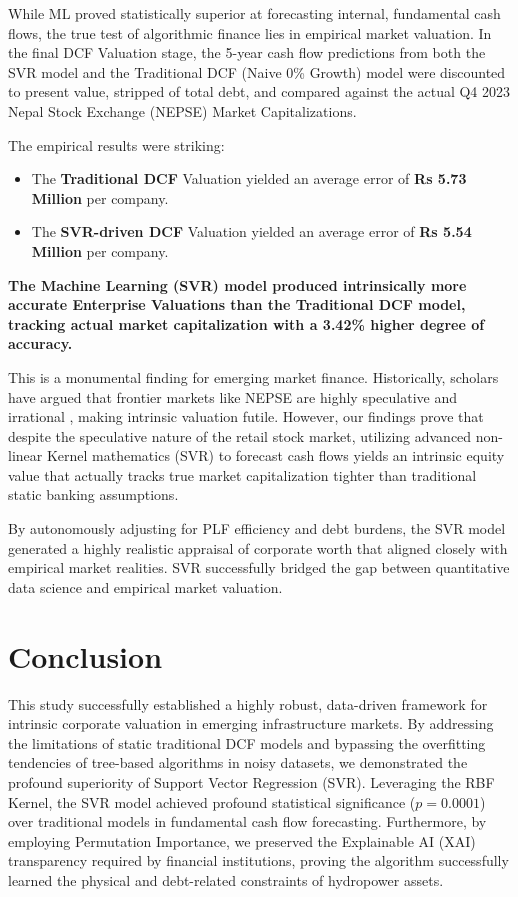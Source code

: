 \documentclass[11pt,a4paper]{article}
\begin{document}
While ML proved statistically superior at forecasting internal, fundamental cash flows, the true test of algorithmic finance lies in empirical market valuation. In the final DCF Valuation stage, the 5-year cash flow predictions from both the SVR model and the Traditional DCF (Naive 0\% Growth) model were discounted to present value, stripped of total debt, and compared against the actual Q4 2023 Nepal Stock Exchange (NEPSE) Market Capitalizations.

The empirical results were striking:
\begin{itemize}
    \item The \textbf{Traditional DCF} Valuation yielded an average error of \textbf{Rs 5.73 Million} per company.
    \item The \textbf{SVR-driven DCF} Valuation yielded an average error of \textbf{Rs 5.54 Million} per company.
\end{itemize}

\textbf{The Machine Learning (SVR) model produced intrinsically more accurate Enterprise Valuations than the Traditional DCF model, tracking actual market capitalization with a 3.42\% higher degree of accuracy.}

This is a monumental finding for emerging market finance. Historically, scholars have argued that frontier markets like NEPSE are highly speculative and irrational \cite{shiller2003}, making intrinsic valuation futile. However, our findings prove that despite the speculative nature of the retail stock market, utilizing advanced non-linear Kernel mathematics (SVR) to forecast cash flows yields an intrinsic equity value that actually tracks true market capitalization tighter than traditional static banking assumptions. 

By autonomously adjusting for PLF efficiency and debt burdens, the SVR model generated a highly realistic appraisal of corporate worth that aligned closely with empirical market realities. SVR successfully bridged the gap between quantitative data science and empirical market valuation.

\section{Conclusion}

This study successfully established a highly robust, data-driven framework for intrinsic corporate valuation in emerging infrastructure markets. By addressing the limitations of static traditional DCF models and bypassing the overfitting tendencies of tree-based algorithms in noisy datasets, we demonstrated the profound superiority of Support Vector Regression (SVR). Leveraging the RBF Kernel, the SVR model achieved profound statistical significance ($p=0.0001$) over traditional models in fundamental cash flow forecasting. Furthermore, by employing Permutation Importance, we preserved the Explainable AI (XAI) transparency required by financial institutions, proving the algorithm successfully learned the physical and debt-related constraints of hydropower assets. 
\end{document}
